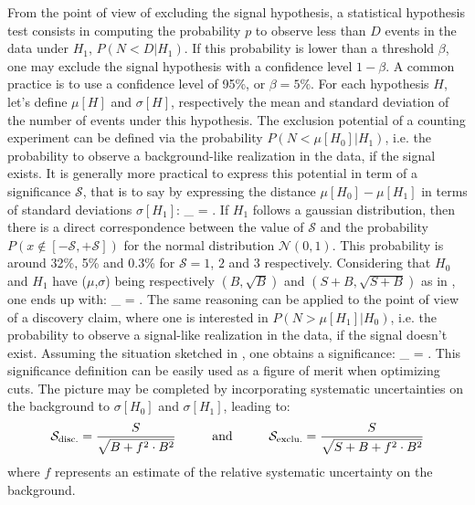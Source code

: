     From the point of view of excluding the signal hypothesis, a statistical hypothesis
    test consists in computing the probability $p$ to observe less than $D$ events in the
    data under $H_1$, $P(N < D|H_1)$. If this probability is lower than a threshold
    $\beta$, one may exclude the signal hypothesis with a confidence level $1-\beta$. A
    common practice is to use a confidence level of 95\%, or $\beta = 5\%$. For each
    hypothesis $H$, let's define $\mu[H]$ and $\sigma[H]$, respectively the mean and
    standard deviation of the number of events under this hypothesis.
    The exclusion potential of a counting experiment can be defined via the probability $P(N < \mu[H_0]|H_1)$,
    i.e. the probability to observe a background-like realization in the data, if the
    signal exists. It is generally more practical to express this potential in term of a
    significance $\mathcal{S}$, that is to say by expressing the distance $\mu[H_0] -
    \mu[H_1]$ in terms of standard deviations $\sigma[H_1]$:
    {
        _ = \frac{\mu[H_0] - \mu[H_1]}{\sigma[H_1]}.
    }
    If $H_1$ follows a gaussian distribution, then there is a direct correspondence
    between the value of $\mathcal{S}$ and the probability $P(x \notin [-\mathcal{S},+\mathcal{S}])$
    for the normal distribution $\mathcal{N}(0,1)$. This probability is around 32\%,
    5\% and 0.3\% for $\mathcal{S} = 1$, $2$ and $3$ respectively.
    Considering that $H_0$ and $H_1$ have ($\mu$,$\sigma$) being respectively
    $(B,\sqrt{B})$ and $(S+B,\sqrt{S+B})$ as in , one ends up
    with:
    {
        _ = .
    }
    The same reasoning can be applied to the point of view of a discovery claim, where
    one is interested in $P(N > \mu[H_1]|H_0)$, i.e. the probability to observe a
    signal-like realization in the data, if the signal doesn't exist. Assuming the situation
    sketched in , one obtains a significance:
    {
        _ = .
    }
    This significance definition can be easily used as a figure of merit when optimizing
    cuts. The picture may be completed by incorporating systematic uncertainties on the
    background to $\sigma[H_0]$ and $\sigma[H_1]$, leading to:
    \begin{equation}
       \mathcal{S}_\text{disc.} = \frac{S}{\sqrt{B+f^2 \cdot B^2}}
       \hspace*{1cm}
       \text{and}
       \hspace*{1cm}
       \mathcal{S}_\text{exclu.} = \frac{S}{\sqrt{S+B+f^2 \cdot B^2}}
       \label{FoM}
   \end{equation}
    where $f$ represents an estimate of the relative systematic uncertainty on the background.

